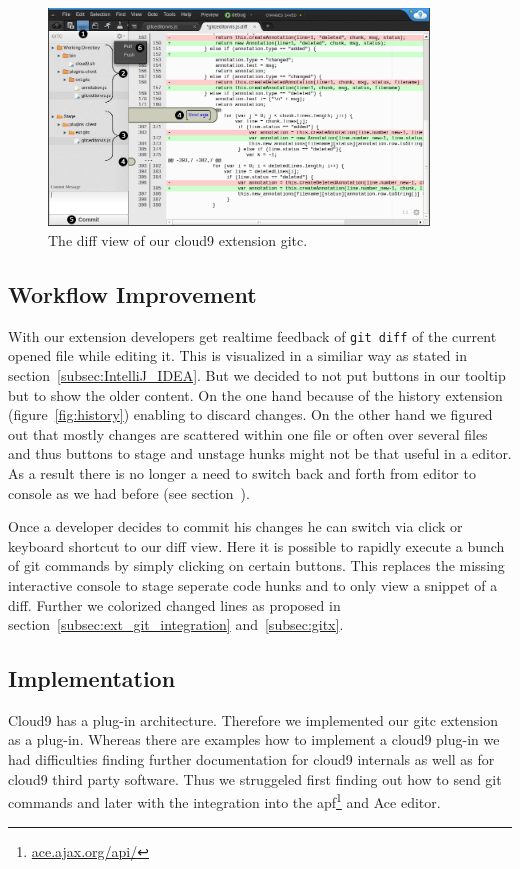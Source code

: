 \begin{figure}
   \centering
   \includegraphics[width=0.9\textwidth]{images/extension_unstage.png}
   \caption{The diff view of our cloud9 extension gitc.}
   \label{fig:diff_view}
\end{figure}

\subsection{Workflow Improvement}
With our extension developers get realtime feedback of \texttt{git diff} of the current opened file while editing it.
This is visualized in a similiar way as stated in section~\ref{subsec:IntelliJ_IDEA}.
But we decided to not put buttons in our tooltip but to show the older content.
On the one hand because of the history extension (figure~\ref{fig:history}) enabling to discard changes.
On the other hand we figured out that mostly changes are scattered within one file or often over several files and thus buttons to stage and unstage hunks might not be that useful in a editor.
As a result there is no longer a need to switch back and forth from editor to console as we had before (see section~).

Once a developer decides to commit his changes he can switch via click or keyboard shortcut to our diff view.
Here it is possible to rapidly execute a bunch of git commands by simply clicking on certain buttons.
This replaces the missing interactive console to stage seperate code hunks and to only view a snippet of a diff.
Further we colorized changed lines as proposed in section~\ref{subsec:ext_git_integration} and~\ref{subsec:gitx}.


\subsection{Implementation}
Cloud9 has a plug-in architecture.
Therefore we implemented our gitc extension as a plug-in.
Whereas there are examples how to implement a cloud9 plug-in we had difficulties finding further documentation for cloud9 internals as well as for cloud9 third party software.
Thus we struggeled first finding out how to send git commands and later with the integration into the apf\footnote{\url{ace.ajax.org/api/}} and Ace editor.

